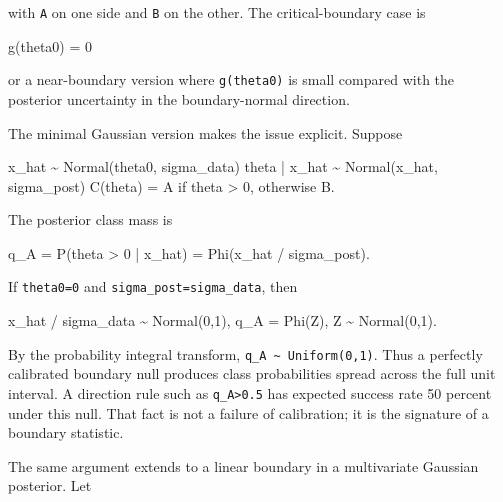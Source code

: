 \documentclass[
]{article}
\newenvironment{Shaded}{}{}
\newcommand{\NormalTok}[1]{#1}
\begin{document}
with \texttt{A} on one side and \texttt{B} on the other. The
critical-boundary case is

\begin{Shaded}
\begin{Highlighting}[]
\NormalTok{g(theta0) = 0}
\end{Highlighting}
\end{Shaded}

or a near-boundary version where \texttt{g(theta0)} is small compared
with the posterior uncertainty in the boundary-normal direction.

The minimal Gaussian version makes the issue explicit. Suppose

\begin{Shaded}
\begin{Highlighting}[]
\NormalTok{x\_hat \textasciitilde{} Normal(theta0, sigma\_data)}
\NormalTok{theta | x\_hat \textasciitilde{} Normal(x\_hat, sigma\_post)}
\NormalTok{C(theta) = A if theta \textgreater{} 0, otherwise B.}
\end{Highlighting}
\end{Shaded}

The posterior class mass is

\begin{Shaded}
\begin{Highlighting}[]
\NormalTok{q\_A = P(theta \textgreater{} 0 | x\_hat) = Phi(x\_hat / sigma\_post).}
\end{Highlighting}
\end{Shaded}

If \texttt{theta0=0} and \texttt{sigma\_post=sigma\_data}, then

\begin{Shaded}
\begin{Highlighting}[]
\NormalTok{x\_hat / sigma\_data \textasciitilde{} Normal(0,1),}
\NormalTok{q\_A = Phi(Z),  Z \textasciitilde{} Normal(0,1).}
\end{Highlighting}
\end{Shaded}

By the probability integral transform,
\texttt{q\_A\ \textasciitilde{}\ Uniform(0,1)}. Thus a perfectly
calibrated boundary null produces class probabilities spread across the
full unit interval. A direction rule such as
\texttt{q\_A\textgreater{}0.5} has expected success rate 50 percent
under this null. That fact is not a failure of calibration; it is the
signature of a boundary statistic.

The same argument extends to a linear boundary in a multivariate
Gaussian posterior. Let
\end{document}

